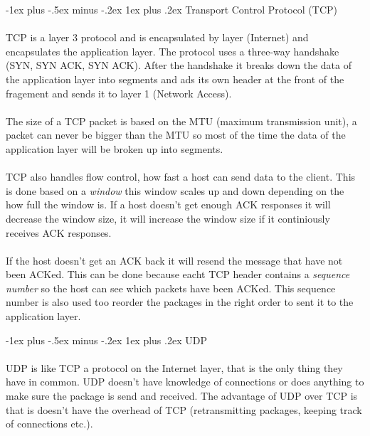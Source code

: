 \documentclass[10pt,landscape]{article}
\makeatletter
\renewcommand{\subsubsection}{\@startsection{subsubsection}{3}{0mm}%
                                {-1ex plus -.5ex minus -.2ex}%
                                {1ex plus .2ex}%
                                {\normalfont\small\bfseries}}
\makeatother
\begin{document}
\begin{multicols}{3}
\subsubsection{Transport Control Protocol (TCP)}
\paragraph{}
TCP is a layer 3 protocol and is encapsulated by layer (Internet) and encapsulates the application layer. The protocol
uses a three-way handshake (SYN, SYN ACK, SYN ACK). After the handshake it breaks down the data of the application layer
into segments and ads its own header at the front of the fragement and sends it to layer 1 (Network Access).
\paragraph{}
The size of a TCP packet is based on the MTU (maximum transmission unit), a packet can never be bigger than the MTU
so most of the time the data of the application layer will be broken up into segments.
\paragraph{}
TCP also handles flow control, how fast a host can send data to the client. This is done based on a \textit{window}
this window scales up and down depending on the how full the window is. If a host doesn't get enough ACK responses
it will decrease the window size, it will increase the window size if it continiously receives ACK responses.
\paragraph{}
If the host doesn't get an ACK back it will resend the message that have not been ACKed. This can be done because
eacht TCP header contains a \textit{sequence number} so the host can see which packets have been ACKed. This sequence number
is also used too reorder the packages in the right order to sent it to the application layer.

\subsubsection{UDP}
\paragraph{}
UDP is like TCP a protocol on the Internet layer, that is the only thing they have in common. UDP doesn't have knowledge of
connections or does anything to make sure the package is send and received. The advantage of UDP over TCP is that is doesn't
have the overhead of TCP (retransmitting packages, keeping track of connections etc.).


\end{multicols}
\end{document}
